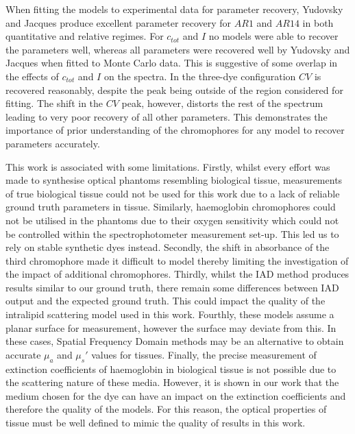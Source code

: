 When fitting the models to experimental data for parameter recovery, Yudovsky and Jacques produce excellent parameter recovery for $AR1$ and $AR14$ in both quantitative and relative regimes. For $c_{tot}$ and $I$ no models were able to recover the parameters well, whereas all parameters were recovered well by Yudovsky and Jacques when fitted to Monte Carlo data. This is suggestive of some overlap in the effects of $c_{tot}$ and $I$ on the spectra. In the three-dye configuration $CV$ is recovered reasonably, despite the peak being outside of the region considered for fitting. The shift in the $CV$ peak, however, distorts the rest of the spectrum leading to very poor recovery of all other parameters. This demonstrates the importance of prior understanding of the chromophores for any model to recover parameters accurately. 

This work is associated with some limitations.
Firstly, whilst every effort was made to synthesise optical phantoms resembling biological tissue, measurements of true biological tissue could not be used for this work due to a lack of reliable ground truth parameters in tissue.
Similarly, haemoglobin chromophores could not be utilised in the phantoms due to their oxygen sensitivity which could not be controlled within the spectrophotometer measurement set-up. This led us to rely on stable synthetic dyes instead.
%
Secondly, the shift in absorbance of the third chromophore made it difficult to model thereby limiting the investigation of the impact of additional chromophores.
%
Thirdly, whilst the IAD method produces results similar to our ground truth, there remain some differences between IAD output and the expected ground truth.
This could impact the quality of the intralipid scattering model used in this work.
%
Fourthly, these models assume a planar surface for measurement, however the surface may deviate from this. In these cases, Spatial Frequency Domain methods may be an alternative to obtain accurate $\mu_a$ and $\mu_s'$ values for tissues\cite{Gioux2019}. 
Finally, the precise measurement of extinction coefficients of haemoglobin in biological tissue is not possible due to the scattering nature of these media.
However, it is shown in our work that the medium chosen for the dye can have an impact on the extinction coefficients and therefore the quality of the models. For this reason, the optical properties of tissue must be well defined to mimic the quality of results in this work.

